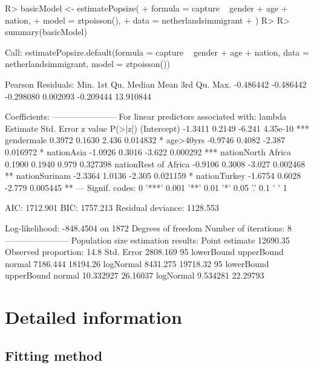 \documentclass[
]{jss}
\newcommand{\1}{\mathcal{I}} \newcommand{\bx}{\boldsymbol{x}}
\begin{document}
\begin{CodeChunk}
\begin{CodeInput}
R> basicModel <- estimatePopsize(
+   formula = capture ~ gender + age + nation,
+   model   = ztpoisson(),
+   data    = netherlandsimmigrant
+ )
R> 
R> summary(basicModel)
\end{CodeInput}
\begin{CodeOutput}

Call:
estimatePopsize.default(formula = capture ~ gender + age + nation, 
    data = netherlandsimmigrant, model = ztpoisson())

Pearson Residuals:
     Min.   1st Qu.    Median      Mean   3rd Qu.      Max. 
-0.486442 -0.486442 -0.298080  0.002093 -0.209444 13.910844 

Coefficients:
-----------------------
For linear predictors associated with: lambda 
                     Estimate Std. Error z value  P(>|z|)    
(Intercept)           -1.3411     0.2149  -6.241 4.35e-10 ***
gendermale             0.3972     0.1630   2.436 0.014832 *  
age>40yrs             -0.9746     0.4082  -2.387 0.016972 *  
nationAsia            -1.0926     0.3016  -3.622 0.000292 ***
nationNorth Africa     0.1900     0.1940   0.979 0.327398    
nationRest of Africa  -0.9106     0.3008  -3.027 0.002468 ** 
nationSurinam         -2.3364     1.0136  -2.305 0.021159 *  
nationTurkey          -1.6754     0.6028  -2.779 0.005445 ** 
---
Signif. codes:  0 '***' 0.001 '**' 0.01 '*' 0.05 '.' 0.1 ' ' 1

AIC: 1712.901
BIC: 1757.213
Residual deviance: 1128.553

Log-likelihood: -848.4504 on 1872 Degrees of freedom 
Number of iterations: 8
-----------------------
Population size estimation results: 
Point estimate 12690.35
Observed proportion: 14.8%
Std. Error 2808.169
95%
          lowerBound upperBound
normal      7186.444   18194.26
logNormal   8431.275   19718.32
95%
          lowerBound upperBound
normal     10.332927   26.16037
logNormal   9.534281   22.29793
\end{CodeOutput}
\end{CodeChunk}

\hypertarget{detailed-information}{%
\section{Detailed information}\label{detailed-information}}

\hypertarget{fitting-method}{%
\subsection{Fitting method}\label{fitting-method}}
\end{document}
